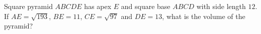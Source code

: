 Square pyramid $ABCDE$ has apex $E$ and square base $ABCD$ with side length $12$. If $AE=\sqrt{193}$, $BE=11$, $CE=\sqrt{97}$ and $DE=13$, what is the volume of the pyramid?
